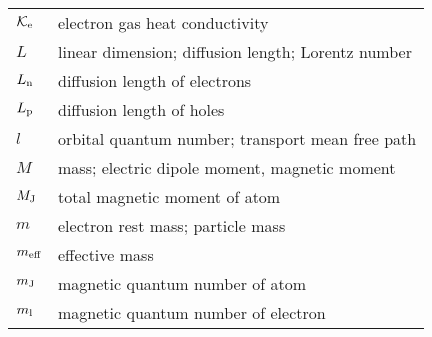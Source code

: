 \begin{table}[h]
\begin{center}
{\begin{tabular}{p{1.0cm} p{10.5cm}}
        $\mathcal{K}_{\text{e}}$ &  electron gas heat conductivity\\
        $L$ & linear dimension; diffusion length; Lorentz number\\
        $L_{\text{n}}$ & diffusion length of electrons\\
        $L_{\text{p}}$ & diffusion length of holes\\
        $l$ & orbital quantum number; transport mean free path\\
        $M$ & mass; electric dipole moment, magnetic moment\\
        $M_{\text{J}}$ & total magnetic moment of atom\\
        $m$ & electron rest mass; particle mass\\
        $m_{\text{eff}}$ & effective mass\\
        $m_{\text{J}}$ & magnetic quantum number of atom\\
        $m_{\text{l}}$ & magnetic quantum number of electron\\
    \end{tabular}
	}\end{center}
\end{table}

